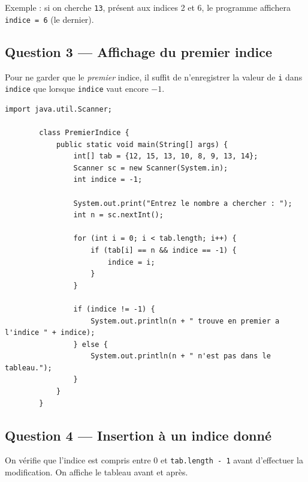 \documentclass[12pt,a4paper]{article}
\begin{document}
	\begin{boiteResultat}
		Exemple : si on cherche \texttt{13}, présent aux indices 2 et 6, le programme
		affichera \texttt{indice = 6} (le dernier).
	\end{boiteResultat}
	
	\subsection*{Question 3 — Affichage du premier indice}
	
	\begin{boiteRaisonnement}
		Pour ne garder que le \emph{premier} indice, il suffit de n'enregistrer la valeur de
		\texttt{i} dans \texttt{indice} que lorsque \texttt{indice} vaut encore $-1$.
	\end{boiteRaisonnement}
	
	\begin{lstlisting}[style=java, caption={Q3 — Premier indice de la valeur}]
		import java.util.Scanner;
		
		class PremierIndice {
			public static void main(String[] args) {
				int[] tab = {12, 15, 13, 10, 8, 9, 13, 14};
				Scanner sc = new Scanner(System.in);
				int indice = -1;
				
				System.out.print("Entrez le nombre a chercher : ");
				int n = sc.nextInt();
				
				for (int i = 0; i < tab.length; i++) {
					if (tab[i] == n && indice == -1) {
						indice = i;
					}
				}
				
				if (indice != -1) {
					System.out.println(n + " trouve en premier a l'indice " + indice);
				} else {
					System.out.println(n + " n'est pas dans le tableau.");
				}
			}
		}
	\end{lstlisting}
	
	\subsection*{Question 4 — Insertion à un indice donné}
	
	\begin{boiteRaisonnement}
		On vérifie que l'indice est compris entre 0 et \texttt{tab.length - 1} avant
		d'effectuer la modification. On affiche le tableau avant et après.
	\end{boiteRaisonnement}
	
\end{document}
